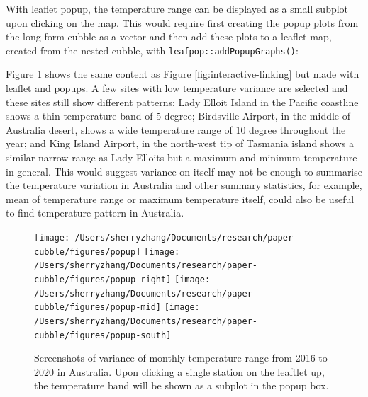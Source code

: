 \documentclass[
]{jss}
\begin{document}
With leaflet popup, the temperature range can be displayed as a small
subplot upon clicking on the map. This would require first creating the
popup plots from the long form cubble as a vector and then add these
plots to a leaflet map, created from the nested cubble, with
\texttt{leafpop::addPopupGraphs()}:

\begin{CodeChunk}
\end{CodeChunk}

Figure \ref{fig:interactive-popup} shows the same content as Figure
\ref{fig:interactive-linking} but made with leaflet and popups. A few
sites with low temperature variance are selected and these sites still
show different patterns: Lady Elloit Island in the Pacific coastline
shows a thin temperature band of 5 degree; Birdsville Airport, in the
middle of Australia desert, shows a wide temperature range of 10 degree
throughout the year; and King Island Airport, in the north-west tip of
Tasmania island shows a similar narrow range as Lady Elloits but a
maximum and minimum temperature in general. This would suggest variance
on itself may not be enough to summarise the temperature variation in
Australia and other summary statistics, for example, mean of temperature
range or maximum temperature itself, could also be useful to find
temperature pattern in Australia.

\begin{CodeChunk}
\begin{figure}

{\centering \texttt{[image: /Users/sherryzhang/Documents/research/paper-cubble/figures/popup]} \texttt{[image: /Users/sherryzhang/Documents/research/paper-cubble/figures/popup-right]} \texttt{[image: /Users/sherryzhang/Documents/research/paper-cubble/figures/popup-mid]} \texttt{[image: /Users/sherryzhang/Documents/research/paper-cubble/figures/popup-south]} 

}

\caption[Screenshots of variance of monthly temperature range from 2016 to 2020 in Australia]{Screenshots of variance of monthly temperature range from 2016 to 2020 in Australia. Upon clicking a single station on the leaftlet up, the temperature band will be shown as a subplot in the popup box.}\label{fig:interactive-popup}
\end{figure}
\end{CodeChunk}
\end{document}
